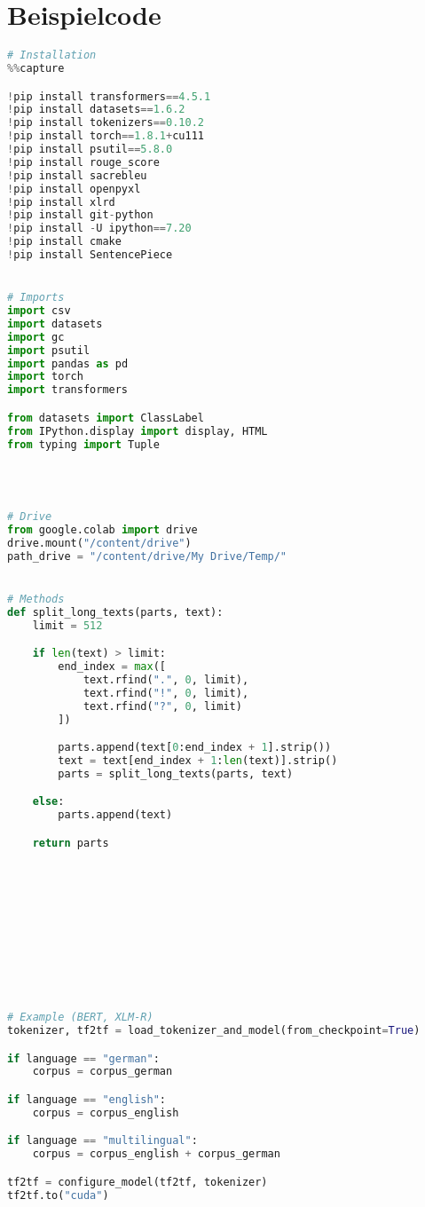 \section*{Beispielcode}
\begin{lstlisting}[language=Python, caption=Beispielcode]
# Installation
%%capture

!pip install transformers==4.5.1
!pip install datasets==1.6.2
!pip install tokenizers==0.10.2
!pip install torch==1.8.1+cu111
!pip install psutil==5.8.0
!pip install rouge_score
!pip install sacrebleu
!pip install openpyxl
!pip install xlrd
!pip install git-python
!pip install -U ipython==7.20
!pip install cmake
!pip install SentencePiece


# Imports
import csv
import datasets
import gc
import psutil
import pandas as pd
import torch
import transformers

from datasets import ClassLabel
from IPython.display import display, HTML
from typing import Tuple




# Drive
from google.colab import drive
drive.mount("/content/drive")
path_drive = "/content/drive/My Drive/Temp/"


# Methods
def split_long_texts(parts, text):
    limit = 512

    if len(text) > limit:
        end_index = max([
            text.rfind(".", 0, limit),
            text.rfind("!", 0, limit),
            text.rfind("?", 0, limit)
        ])

        parts.append(text[0:end_index + 1].strip())
        text = text[end_index + 1:len(text)].strip()
        parts = split_long_texts(parts, text)

    else:
        parts.append(text)

    return parts
    










# Example (BERT, XLM-R)
tokenizer, tf2tf = load_tokenizer_and_model(from_checkpoint=True)

if language == "german":
    corpus = corpus_german

if language == "english":
    corpus = corpus_english

if language == "multilingual":
    corpus = corpus_english + corpus_german

tf2tf = configure_model(tf2tf, tokenizer)
tf2tf.to("cuda")


\end{lstlisting}
